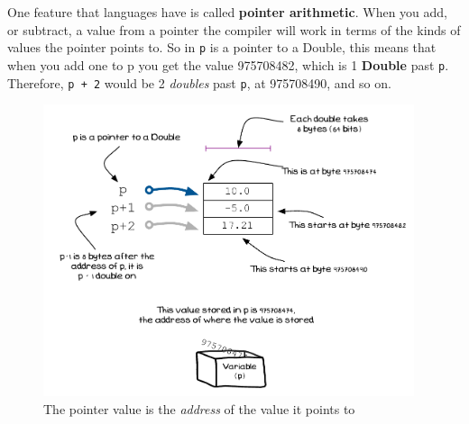 One feature that languages have is called \textbf{pointer arithmetic}. When you add, or subtract, a value from a pointer the compiler will work in terms of the kinds of values the pointer points to. So in  \texttt{p} is a pointer to a Double, this means that when you add one to p you get the value 975708482, which is 1 \textbf{Double} past \texttt{p}. Therefore, \texttt{p + 2} would be 2 \emph{doubles} past \texttt{p}, at 975708490, and so on.

\begin{figure}[h]
   \centering
   \includegraphics[width=0.97\textwidth]{./topics/dynamic-memory/diagrams/PointerArithmetic} 
   \caption{The pointer value is the \emph{address} of the value it points to}
   \label{fig:pointer-arithmetic}
\end{figure}



